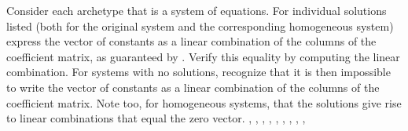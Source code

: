 Consider each archetype that is a system of equations. For individual solutions listed (both for the original system and the corresponding homogeneous system) express the vector of constants as a linear combination of the columns of the coefficient matrix, as guaranteed by .  Verify this equality by computing the linear combination.  For systems with no solutions, recognize that it is then impossible to write the vector of constants as a linear combination of the columns of the coefficient matrix.  Note too, for homogeneous systems, that the solutions give rise to linear combinations that equal the zero vector.\newline\newline
{},
,
,
,
,
,
,
,
,


